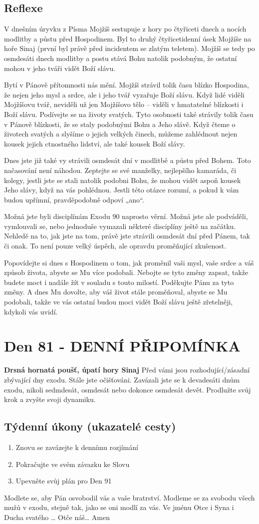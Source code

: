 \documentclass[11pt]{article}
\newcommand{\zacatekDvanactyTyden}{
\textbf{Drsná hornatá poušť, úpatí hory Sinaj} \newline 
Před vámi jsou rozhodující/zásadní zbývající dny exodu. Stále jste očišťováni. Zavázali jste se k devadesáti dnům exodu, nikoli sedmdesát, osmdesát nebo dokonce osmdesát devět. Prodlužte svůj krok a zvyšte svoji dynamiku.

\subsection*{Týdenní úkony (ukazatelé cesty)}
\begin{enumerate}
  \item Znovu se zavázejte k dennímu rozjímání
  \item Pokračujte ve svém závazku ke Slovu
  \item Upevněte svůj plán pro Den 91
\end{enumerate}
Modlete se, aby Pán osvobodil vás a vaše bratrství. \newline
Modleme se za svobodu všech mužů v exodu, stejně tak, jako se oni modlí za vás.\newline
Ve jménu Otce i Syna i Ducha svatého …  Otče náš… Amen
}
\begin{document}
\subsection*{Reflexe}
V dnešním úryvku z Písma Mojžíš sestupuje z hory po čtyřiceti dnech a nocích modlitby a půstu před Hospodinem. Byl to druhý
čtyřicetidenní úsek Mojžíše na hoře Sinaj (první byl právě před incidentem se zlatým teletem). Mojžíš se tedy po osmdesáti dnech
modlitby a postu stává Bohu natolik podobným, že ostatní mohou v jeho tváři vidět Boží slávu.

Bytí v Pánově přítomnosti nás mění. Mojžíš strávil tolik času blízko Hospodina, že nejen jeho mysl a srdce, ale i jeho tvář vyzařuje
Boží slávu. Když lidé viděli Mojžíšovu tvář, neviděli už jen Mojžíšovo tělo – viděli v hmatatelné blízkosti i Boží slávu. Podívejte
se na životy svatých. Tyto osobnosti také strávily tolik času v Pánově blízkosti, že se staly podobnými Bohu a Jeho slávě. Když
čteme o životech svatých a slyšíme o jejich velkých činech, můžeme zahlédnout nejen kousek jejich ctnostného lidství, ale také
kousek Boží slávy.

Dnes jste již také vy strávili osmdesát dní v modlitbě a půstu před Bohem. Toto načasování není náhodou. Zeptejte se své
manželky, nejlepšího kamaráda, či kolegy, jestli jste se stali natolik podobni Bohu, že mohou vidět aspoň kousek Jeho slávy, když
na vás pohlédnou. Jestli této otázce rozumí, a pokud k vám budou upřímní, pravděpodobně odpoví „ano“.

Možná jste byli disciplínám Exodu 90 naprosto věrní. Možná jste ale podváděli, vymlouvali se, nebo jednoduše vymazali některé
disciplíny ještě na začátku. Nehledě na to, jak jste na tom, právě jste strávili osmdesát dní před Pánem, tak či onak. To není pouze
velký úspěch, ale opravdu proměňující zkušenost.

Popovídejte si dnes s Hospodinem o tom, jak proměnil vaši mysl, vaše srdce a váš způsob života, abyste se Mu více podobali.
Nebojte se tyto změny zapsat, takže budete moct i nadále žít v souladu s touto milostí. Poděkujte Pánu za tyto změny. A dnes Mu
dovolte, aby váš život stále proměňoval, abyste se Mu podobali, takže ve vás ostatní budou moci vidět Boží slávu ještě zřetelněji,
kdykoli vás uvidí.


\newpage
\section{Den 81 - DENNÍ PŘIPOMÍNKA}
\zacatekDvanactyTyden
\end{document}
